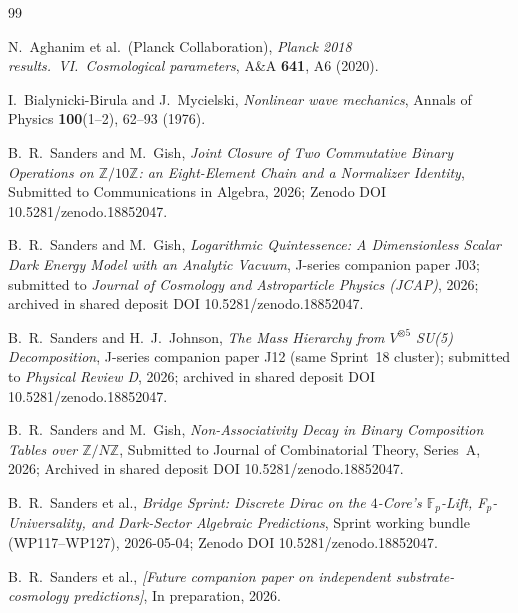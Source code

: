 \documentclass[11pt,reqno]{amsart}
\theoremstyle{plain}
\theoremstyle{definition}
\theoremstyle{remark}
\newcommand{\F}{\mathbb{F}}
\begin{document}
\begin{thebibliography}{99}

N.~Aghanim et al.\ (Planck Collaboration),
\emph{Planck 2018 results.\ VI.\ Cosmological parameters},
A\&A \textbf{641}, A6 (2020).

I.~Bialynicki-Birula and J.~Mycielski,
\emph{Nonlinear wave mechanics},
Annals of Physics \textbf{100}(1--2), 62--93 (1976).

B.~R.~Sanders and M.~Gish,
\emph{Joint Closure of Two Commutative Binary Operations on
$\mathbb{Z}/10\mathbb{Z}$: an Eight-Element Chain and a
Normalizer Identity},
Submitted to Communications in Algebra, 2026;
Zenodo DOI 10.5281/zenodo.18852047.

B.~R.~Sanders and M.~Gish,
\emph{Logarithmic Quintessence: A Dimensionless Scalar Dark
Energy Model with an Analytic Vacuum},
J-series companion paper J03; submitted to
\emph{Journal of Cosmology and Astroparticle Physics (JCAP)},
2026; archived in shared deposit DOI 10.5281/zenodo.18852047.

B.~R.~Sanders and H.~J.~Johnson,
\emph{The Mass Hierarchy from $V^{\otimes 5}$ SU(5) Decomposition},
J-series companion paper J12 (same Sprint~18 cluster);
submitted to \emph{Physical Review D}, 2026;
archived in shared deposit DOI 10.5281/zenodo.18852047.

B.~R.~Sanders and M.~Gish,
\emph{Non-Associativity Decay in Binary Composition Tables over
$\mathbb{Z}/N\mathbb{Z}$},
Submitted to Journal of Combinatorial Theory, Series~A, 2026;
Archived in shared deposit DOI 10.5281/zenodo.18852047.

B.~R.~Sanders et al.,
\emph{Bridge Sprint: Discrete Dirac on the $4$-Core's
$\F_p$-Lift, F$_p$-Universality, and Dark-Sector Algebraic
Predictions},
Sprint working bundle (WP117--WP127), 2026-05-04;
Zenodo DOI 10.5281/zenodo.18852047.

B.~R.~Sanders et al.,
\emph{[Future companion paper on independent
substrate-cosmology predictions]},
In preparation, 2026.

\end{thebibliography}
\end{document}

